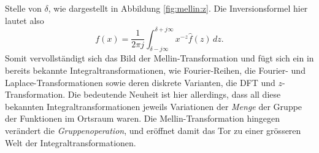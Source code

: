 Stelle von $\delta$, wie dargestellt in Abbildung \ref{fig:mellin:z}.
Die Inversionsformel hier lautet also
\begin{equation}
    f(x) 
    = \frac{1}{2\pi j} 
    \int_{\delta -j\infty}^{\delta +j\infty} 
    x^{-z} \hat{f}(z) \,{d}z
    .
    \label{mellin:mellininv}
\end{equation}
Somit vervollständigt sich das Bild der Mellin-Transformation und fügt 
sich ein in bereits bekannte Integraltransformationen, wie Fourier-Reihen, 
die Fourier- und Laplace-Transformationen sowie deren diskrete Varianten, 
die DFT und $z$-Transformation. Die bedeutende Neuheit ist hier allerdings, 
dass all diese bekannten Integraltransformationen jeweils Variationen der 
{\em Menge} der Gruppe der Funktionen im Ortsraum waren.
Die Mellin-Transformation hingegen verändert die {\em Gruppenoperation}, 
und eröffnet damit das Tor zu einer grösseren Welt der 
Integraltransformationen.
